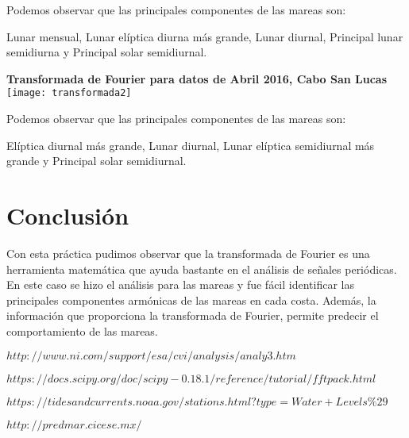 \documentclass[12pt]{article}
\begin{document}
\begin{doublespace}
Podemos observar que las principales componentes de las mareas son:

Lunar mensual, Lunar elíptica diurna más grande, Lunar diurnal, Principal lunar semidiurna y Principal solar semidiurnal.

\pagebreak

\begin{center}
\textbf{Transformada de Fourier para datos de Abril 2016, Cabo San Lucas}
\texttt{[image: transformada2]}
\end{center}

Podemos observar que las principales componentes de las mareas son:

Elíptica diurnal más grande, Lunar diurnal, Lunar elíptica semidiurnal más grande y Principal solar semidiurnal.

\section{Conclusión}
Con esta práctica pudimos observar que la transformada de Fourier es una herramienta matemática que ayuda bastante en el análisis de señales periódicas. En este caso se hizo el análisis para las mareas y fue fácil identificar las principales componentes armónicas de las mareas en cada costa. Además, la información que proporciona la transformada de Fourier, permite predecir el comportamiento de las mareas.

\newpage
\renewcommand{\refname}{\section{Referencias}}
\begin{thebibliography}{9}
 \textsc{$http://www.ni.com/support/esa/cvi/analysis/analy3.htm$}

 \textsc{$https://docs.scipy.org/doc/scipy-0.18.1/reference/tutorial/fftpack.html$}

 \textsc{$https://tidesandcurrents.noaa.gov/stations.html?type=Water+Levels\%29$}

 \textsc{$http://predmar.cicese.mx/$}
\end{thebibliography}
\end{doublespace}
\end{document}
